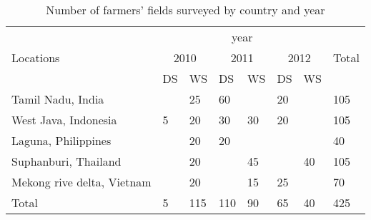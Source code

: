 \begin{table}
\centering
    \begin{tabular}{llllllll}
    \hline
    \multirow{3}{*}{Locations} & \multicolumn{6}{c}{year} & \multirow{3}{*}{Total} \\ \cline{2-7}
                         & \multicolumn{2}{c}{2010} & \multicolumn{2}{c}{2011} & \multicolumn{2}{c}{2012} &     \\ \cline{2-7}
                         & DS         & WS         & DS          & WS         & DS          & WS         &     \\
                        \hline
        Tamil Nadu, India           &            & 25          & 60          &            & 20          &            & 105  \\
        West Java, Indonesia       & 5          & 20          & 30          & 30         & 20          &            & 105  \\
        Laguna, Philippines     &            & 20          & 20          &            &             &            & 40   \\
        Suphanburi, Thailand        &            & 20          &             & 45         &             & 40         & 105  \\
        Mekong rive delta, Vietnam         &            & 20          &             & 15         & 25          &            & 70   \\
                        \hline
        Total           & 5          & 115         & 110         & 90         & 65          & 40         & 425   \\
        \hline               
    \end{tabular}
    \caption{Number of farmers' fields surveyed by country and year}
    \label{table:Survey_data}
\end{table}